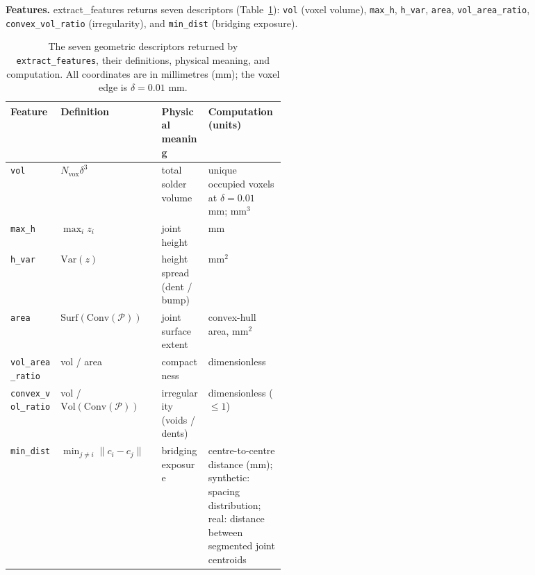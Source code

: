 \documentclass[3p]{elsarticle}
\begin{document}
\textbf{Features. }extract\_features returns seven descriptors (Table~\ref{tab:feat}): \texttt{vol} (voxel volume), \texttt{max\_h}, \texttt{h\_var}, \texttt{area}, \texttt{vol\_area\_ratio}, \texttt{convex\_vol\_ratio} (irregularity), and \texttt{min\_dist} (bridging exposure).
\begin{table}[htbp]
\centering
\caption{The seven geometric descriptors returned by \texttt{extract\_features}, their definitions, physical meaning, and computation. All coordinates are in millimetres (mm); the voxel edge is $\delta = 0.01$ mm.}
\label{tab:feat}
{\small
\begin{tabular}{llp{0.17\linewidth}p{0.29\linewidth}}
\toprule
\textbf{Feature} & \textbf{Definition} & \textbf{Physical meaning} & \textbf{Computation (units)} \\
\midrule
\texttt{vol} & $N_{\mathrm{vox}}\delta^{3}$ & total solder volume & unique occupied voxels at $\delta{=}0.01$ mm; mm$^{3}$ \\
\texttt{max\_h} & $\max_i z_i$ & joint height & mm \\
\texttt{h\_var} & $\mathrm{Var}(z)$ & height spread (dent / bump) & mm$^{2}$ \\
\texttt{area} & $\mathrm{Surf}(\mathrm{Conv}(\mathcal{P}))$ & joint surface extent & convex-hull area, mm$^{2}$ \\
\texttt{vol\_area\_ratio} & vol / area & compactness & dimensionless \\
\texttt{convex\_vol\_ratio} & vol / $\mathrm{Vol}(\mathrm{Conv}(\mathcal{P}))$ & irregularity (voids / dents) & dimensionless ($\le 1$) \\
\texttt{min\_dist} & $\min_{j\ne i}\lVert c_i-c_j\rVert$ & bridging exposure & centre-to-centre distance (mm); synthetic: spacing distribution; real: distance between segmented joint centroids \\
\bottomrule
\end{tabular}
}
\end{table}
\end{document}
